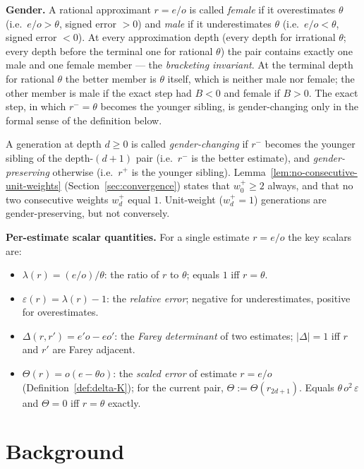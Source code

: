 \documentclass[12pt]{article}
\theoremstyle{definition}
\theoremstyle{remark}
\theoremstyle{plain}
\newcommand{\eps}{\varepsilon}
\newcommand{\Kval}{\Theta}
\newcommand{\rplus}{r^{+}}
\newcommand{\rminus}{r^{-}}
\begin{document}
\textbf{Gender.}
A rational approximant $r = e/o$ is called \emph{female} if it overestimates
$\theta$ (i.e.\ $e/o > \theta$, signed error $> 0$) and \emph{male} if it
underestimates $\theta$ (i.e.\ $e/o < \theta$, signed error $< 0$).
At every approximation depth (every depth for irrational $\theta$; every depth before the
terminal one for rational $\theta$) the pair contains exactly one male and one female
member --- the \emph{bracketing invariant}.
At the terminal depth for rational $\theta$ the better member is $\theta$ itself, which
is neither male nor female; the other member is male if the exact step had $B < 0$ and
female if $B > 0$.
The exact step, in which $\rminus = \theta$ becomes the younger sibling, is
gender-changing only in the formal sense of the definition below.

A generation at depth $d \geq 0$ is called \emph{gender-changing} if $\rminus$
becomes the younger sibling of the depth-$(d+1)$ pair (i.e.\ $\rminus$ is the
better estimate), and \emph{gender-preserving} otherwise (i.e.\ $\rplus$ is the
younger sibling).
Lemma~\ref{lem:no-consecutive-unit-weights} (Section~\ref{sec:convergence}) states that $w^+_0 \ge 2$ always, and
that no two consecutive weights $w^+_d$ equal $1$.
Unit-weight ($w^+_d = 1$) generations are gender-preserving, but not conversely.

\textbf{Per-estimate scalar quantities.}
For a single estimate $r = e/o$ the key scalars are:
\begin{itemize}
  \item $\lambda(r) = (e/o)/\theta$: the ratio of $r$ to $\theta$; equals $1$ iff $r = \theta$.
  \item $\eps(r) = \lambda(r) - 1$: the \emph{relative error}; negative for underestimates,
    positive for overestimates.
  \item $\Delta(r, r') = e' o - e o'$: the \emph{Farey determinant} of two estimates;
    $|\Delta| = 1$ iff $r$ and $r'$ are Farey adjacent.
  \item $\Kval(r) = o(e - \theta o)$: the \emph{scaled error} of estimate $r = e/o$
    (Definition~\ref{def:delta-K}); for the current pair, $\Kval := \Kval(r_{2d+1})$.
    Equals $\theta\, o^2\,\eps$ and $\Kval = 0$ iff $r = \theta$ exactly.
\end{itemize}

\part{Background}
\end{document}
